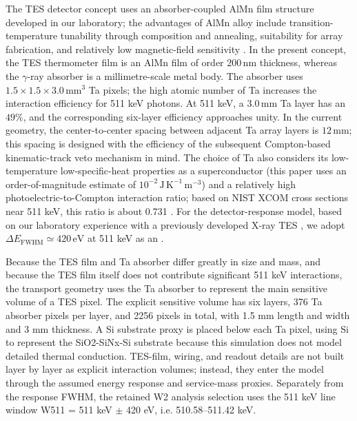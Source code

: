 \documentclass[11pt]{article}
\begin{document}
The TES detector concept uses an absorber-coupled AlMn film structure developed in our laboratory; the advantages of AlMn alloy include transition-temperature tunability through composition and annealing, suitability for array fabrication, and relatively low magnetic-field sensitivity \cite{Xie2026AlMn,Vavagiakis2017AlMnMagnetic}. In the present concept, the TES thermometer film is an AlMn film of order $200\,\mathrm{nm}$ thickness, whereas the $\gamma$-ray absorber is a millimetre-scale metal body. The absorber uses $1.5\times1.5\times3.0\,\mathrm{mm^3}$ Ta pixels; the high atomic number of Ta increases the interaction efficiency for 511 keV photons. At 511 keV, a $3.0\,\mathrm{mm}$ Ta layer has an  $49\%$, and the corresponding six-layer efficiency approaches unity. In the current geometry, the center-to-center spacing between adjacent Ta array layers is $12\,\mathrm{mm}$; this spacing is designed with the efficiency of the subsequent Compton-based kinematic-track veto mechanism in mind. The choice of Ta also considers its low-temperature low-specific-heat properties as a superconductor (this paper uses an order-of-magnitude estimate of $10^{-2}\,\mathrm{J\,K^{-1}\,m^{-3}}$) and a relatively high photoelectric-to-Compton interaction ratio; based on NIST XCOM cross sections near 511 keV, this ratio is about 0.731 \cite{NISTXCOM}. For the detector-response model, based on our laboratory experience with a previously developed X-ray TES \cite{Xie2026AlMn}, we adopt $\Delta E_{\mathrm{FWHM}}\simeq420\,\mathrm{eV}$ at 511 keV as an .

Because the TES film and Ta absorber differ greatly in size and mass, and because the TES film itself does not contribute significant 511 keV interactions, the transport geometry uses the Ta absorber to represent the main sensitive volume of a TES pixel. The explicit sensitive volume has six layers, 376 Ta absorber pixels per layer, and 2256 pixels in total, with 1.5 mm length and width and 3 mm thickness. A Si substrate proxy is placed below each Ta pixel, using Si to represent the SiO2-SiNx-Si substrate because this simulation does not model detailed thermal conduction. TES-film, wiring, and readout details are not built layer by layer as explicit interaction volumes; instead, they enter the model through the assumed energy response and service-mass proxies. Separately from the response FWHM, the retained W2 analysis selection uses the 511 keV line window W511 = 511 keV $\pm$ 420 eV, i.e. 510.58--511.42 keV.
\end{document}
